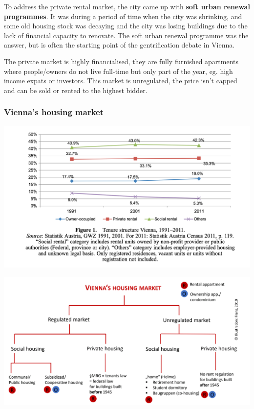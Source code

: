 \documentclass{article}
\begin{document}
To address the private rental market, the city came up with \textbf{soft urban renewal programmes}. It was during a period of time when the city was shrinking, and some old housing stock was decaying and the city was losing buildings due to the lack of financial capacity to renovate. The soft urban renewal programme was the answer, but is often the starting point of the gentrification debate in Vienna.

The private market is highly financialised, they are fully furnished apartments where people/owners do not live full-time but only part of the year, eg. high income expats or investors. This market is unregulated, the price isn't capped and can be sold or rented to the highest bidder.

\subsubsection{Vienna's housing market}

\includegraphics[width=\textwidth]{Vienna_housing_segments}

\includegraphics[width=\textwidth]{Vienna_housing_market}
\end{document}
